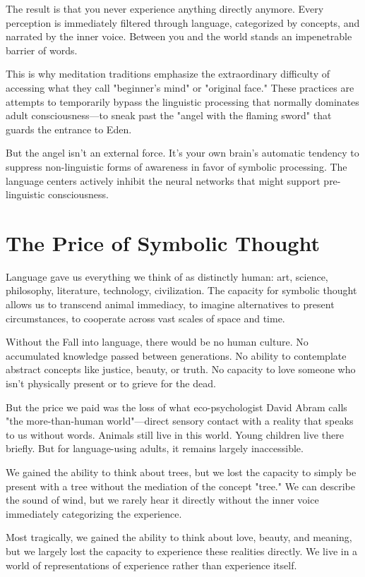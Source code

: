 \documentclass[10pt,twocolumn]{article}
\begin{document}
The result is that you never experience anything directly anymore. Every perception is immediately filtered through language, categorized by concepts, and narrated by the inner voice. Between you and the world stands an impenetrable barrier of words.

This is why meditation traditions emphasize the extraordinary difficulty of accessing what they call "beginner's mind" or "original face." These practices are attempts to temporarily bypass the linguistic processing that normally dominates adult consciousness—to sneak past the "angel with the flaming sword" that guards the entrance to Eden.

But the angel isn't an external force. It's your own brain's automatic tendency to suppress non-linguistic forms of awareness in favor of symbolic processing. The language centers actively inhibit the neural networks that might support pre-linguistic consciousness.

\section{The Price of Symbolic Thought}

Language gave us everything we think of as distinctly human: art, science, philosophy, literature, technology, civilization. The capacity for symbolic thought allows us to transcend animal immediacy, to imagine alternatives to present circumstances, to cooperate across vast scales of space and time.

Without the Fall into language, there would be no human culture. No accumulated knowledge passed between generations. No ability to contemplate abstract concepts like justice, beauty, or truth. No capacity to love someone who isn't physically present or to grieve for the dead.

But the price we paid was the loss of what eco-psychologist David Abram calls "the more-than-human world"—direct sensory contact with a reality that speaks to us without words. Animals still live in this world. Young children live there briefly. But for language-using adults, it remains largely inaccessible.

We gained the ability to think about trees, but we lost the capacity to simply be present with a tree without the mediation of the concept "tree." We can describe the sound of wind, but we rarely hear it directly without the inner voice immediately categorizing the experience.

Most tragically, we gained the ability to think about love, beauty, and meaning, but we largely lost the capacity to experience these realities directly. We live in a world of representations of experience rather than experience itself.
\end{document}
